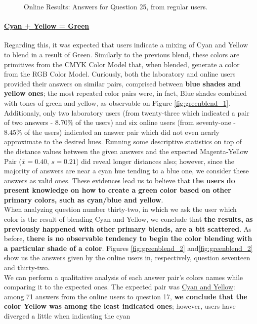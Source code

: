 \begin{figure}[!htbp]
\begin{minipage}{0.48\textwidth}
    \caption[Online Results: Answers for Question 25, from regular users.]{Online Results: Answers for Question 25, from regular users.}
    \label{fig:redblend_2}
  \end{minipage}
\end{figure}
%
\paragraph{\ul{Cyan + Yellow = Green}}
%
Regarding this, it was expected that users indicate a mixing of Cyan and Yellow to blend in a result of Green. Similarly to the previous blend, these colors are primitives from the CMYK Color Model that, when blended,
generate a color from the RGB Color Model. Curiously, both the laboratory and online users provided their answers on similar pairs, comprised between \textbf{blue shades and yellow ones}; the most repeated
color pairs were, in fact, Blue shades combined with tones of green and yellow, as observable on Figure \ref{fig:greenblend_1}. \\
%
Additionaly, only two laboratory users (from twenty-three which indicated a pair of two answers - $8.70\%$ of the users) and six online users (from seventy-one - $8.45\%$ of the users) indicated an answer pair which did not even
nearly approximate to the desired hues. Running some descriptive statistics on top of the distance values between the given answers and the expected Magenta-Yellow Pair ($\overline{x} = 0.40$, $s = 0.21$) did reveal longer distances
also; however, since the majority of answers are near a cyan hue tending to a blue one, we consider these answers as valid ones. These evidences lead us to believe that \textbf{the users do present knowledge on how to create a green color
based on other primary colors, such as cyan/blue and yellow}. \\
%
When analyzing question number thirty-two, in which we ask the user which color is the result of blending Cyan and Yellow, we conclude that \textbf{the results, as previously happened with other primary blends, are a bit scattered}.
As before, \textbf{there is no observable tendency to begin the color blending with a particular shade of a color}. Figures \ref{fig:greenblend_2} and\ref{fig:greenblend_2} show us the answers given by the online users in, respectively,
question seventeen and thirty-two. \\
%
We can perform a qualitative analysis of each answer pair's colors names while comparing it to the expected ones. The
expected pair was \ul{Cyan and Yellow}: among 71 answers from the online users to question 17, \textbf{we conclude
that the color Yellow was among the least indicated ones}; however, users have diverged a little when indicating the cyan
